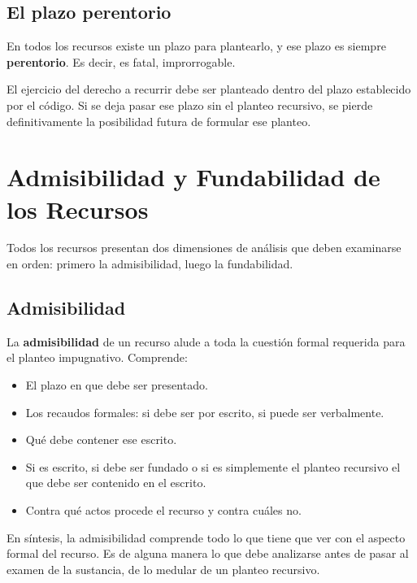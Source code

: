\documentclass[12pt,oneside]{book}
\begin{document}
\section{El plazo perentorio}

En todos los recursos existe un plazo para plantearlo, y ese plazo es siempre \textbf{perentorio}. Es decir, es fatal, improrrogable.

\begin{important}
El ejercicio del derecho a recurrir debe ser planteado dentro del plazo establecido por el código. Si se deja pasar ese plazo sin el planteo recursivo, se pierde definitivamente la posibilidad futura de formular ese planteo.
\end{important}


\chapter{Admisibilidad y Fundabilidad de los Recursos}

Todos los recursos presentan dos dimensiones de análisis que deben examinarse en orden: primero la admisibilidad, luego la fundabilidad.

\section{Admisibilidad}

La \textbf{admisibilidad} de un recurso alude a toda la cuestión formal requerida para el planteo impugnativo. Comprende:

\begin{itemize}
    \item El plazo en que debe ser presentado.
    \item Los recaudos formales: si debe ser por escrito, si puede ser verbalmente.
    \item Qué debe contener ese escrito.
    \item Si es escrito, si debe ser fundado o si es simplemente el planteo recursivo el que debe ser contenido en el escrito.
    \item Contra qué actos procede el recurso y contra cuáles no.
\end{itemize}

En síntesis, la admisibilidad comprende todo lo que tiene que ver con el aspecto formal del recurso. Es de alguna manera lo que debe analizarse antes de pasar al examen de la sustancia, de lo medular de un planteo recursivo.
\end{document}
